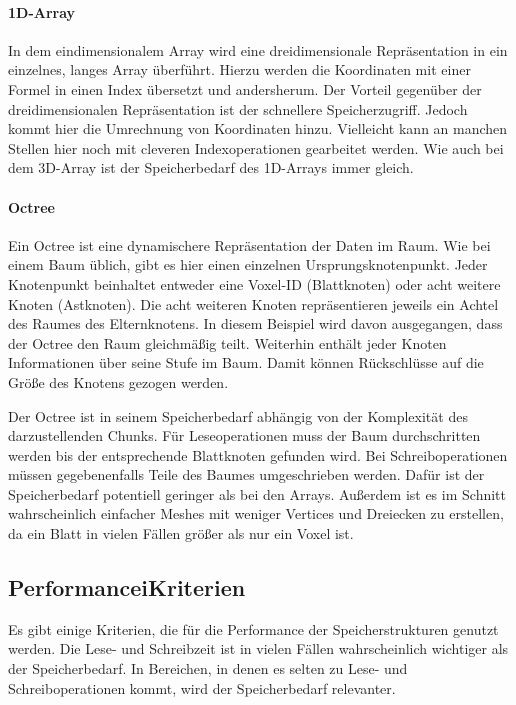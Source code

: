 \documentclass[
a4paper,     %
12pt         %
]{scrartcl}  %
\begin{document}
\paragraph{1D-Array}
In dem eindimensionalem Array wird eine dreidimensionale Repräsentation in ein einzelnes, langes Array überführt. Hierzu werden die Koordinaten mit einer Formel in einen Index übersetzt und andersherum. Der Vorteil gegenüber der dreidimensionalen Repräsentation ist der schnellere Speicherzugriff. Jedoch kommt hier die Umrechnung von Koordinaten hinzu. Vielleicht kann an manchen Stellen hier noch mit cleveren Indexoperationen gearbeitet werden. Wie auch bei dem 3D-Array ist der Speicherbedarf des 1D-Arrays immer gleich.

\paragraph{Octree}
Ein Octree ist eine dynamischere Repräsentation der Daten im Raum. Wie bei einem Baum üblich, gibt es hier einen einzelnen Ursprungsknotenpunkt. Jeder Knotenpunkt beinhaltet entweder eine Voxel-ID (Blattknoten) oder acht weitere Knoten (Astknoten). Die acht weiteren Knoten repräsentieren jeweils ein Achtel des Raumes des Elternknotens. In diesem Beispiel wird davon ausgegangen, dass der Octree den Raum gleichmäßig teilt. Weiterhin enthält jeder Knoten Informationen über seine Stufe im Baum. Damit können Rückschlüsse auf die Größe des Knotens gezogen werden.

Der Octree ist in seinem Speicherbedarf abhängig von der Komplexität des darzustellenden Chunks. Für Leseoperationen muss der Baum durchschritten werden bis der entsprechende Blattknoten gefunden wird. Bei Schreiboperationen müssen gegebenenfalls Teile des Baumes umgeschrieben werden. Dafür ist der Speicherbedarf potentiell geringer als bei den Arrays. Außerdem ist es im Schnitt wahrscheinlich einfacher Meshes mit weniger Vertices und Dreiecken zu erstellen, da ein Blatt in vielen Fällen größer als nur ein Voxel ist.

\subsection{PerformanceiKriterien}
Es gibt einige Kriterien, die für die Performance der Speicherstrukturen genutzt werden. Die Lese- und Schreibzeit ist in vielen Fällen wahrscheinlich wichtiger als der Speicherbedarf. In Bereichen, in denen es selten zu Lese- und Schreiboperationen kommt, wird der Speicherbedarf relevanter.
\end{document}
